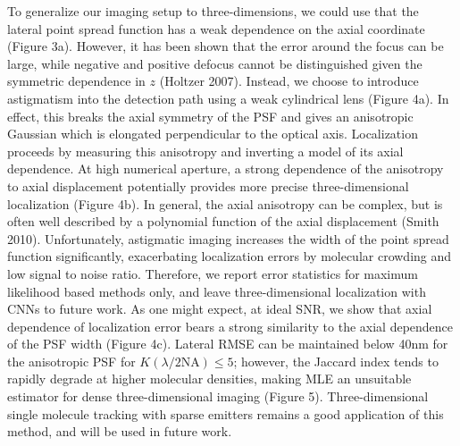 \documentclass{ucetd}
\begin{document}
To generalize our imaging setup to three-dimensions, we could use that the lateral point spread function has a weak dependence on the axial coordinate (Figure 3a). However, it has been shown that the error around the focus can be large, while negative and positive defocus cannot be distinguished given the symmetric dependence in $z$ (Holtzer 2007). Instead, we choose to introduce astigmatism into the detection path using a weak cylindrical lens (Figure 4a). In effect, this breaks the axial symmetry of the PSF and gives an anisotropic Gaussian which is elongated perpendicular to the optical axis. Localization proceeds by measuring this anisotropy and inverting a model of its axial dependence. At high numerical aperture, a strong dependence of the anisotropy to axial displacement potentially provides more precise three-dimensional localization (Figure 4b). In general, the axial anisotropy can be complex, but is often well described by a polynomial function of the axial displacement (Smith 2010). Unfortunately, astigmatic imaging increases the width of the point spread function significantly, exacerbating localization errors by molecular crowding and low signal to noise ratio. Therefore, we report error statistics for maximum likelihood based methods only, and leave three-dimensional localization with CNNs to future work. As one might expect, at ideal SNR, we show that axial dependence of localization error bears a strong similarity to the axial dependence of the PSF width (Figure 4c). Lateral RMSE can be maintained below 40nm for the anisotropic PSF for $K(\lambda/2\mathrm{NA}) \leq 5$; however, the Jaccard index tends to rapidly degrade at higher molecular densities, making MLE an unsuitable estimator for dense three-dimensional imaging (Figure 5). Three-dimensional single molecule tracking with sparse emitters remains a good application of this method, and will be used in future work.
\end{document}
